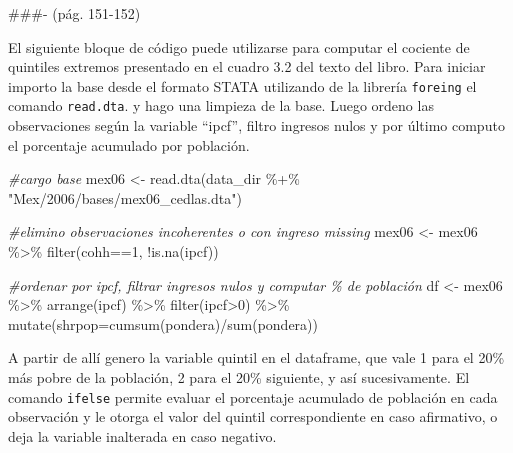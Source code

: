 \documentclass[
]{book}
\newenvironment{Shaded}{\begin{snugshade}}{\end{snugshade}}
\newcommand{\AttributeTok}[1]{\textcolor[rgb]{0.77,0.63,0.00}{#1}}
\newcommand{\CommentTok}[1]{\textcolor[rgb]{0.56,0.35,0.01}{\textit{#1}}}
\newcommand{\DecValTok}[1]{\textcolor[rgb]{0.00,0.00,0.81}{#1}}
\newcommand{\FunctionTok}[1]{\textcolor[rgb]{0.00,0.00,0.00}{#1}}
\newcommand{\NormalTok}[1]{#1}
\newcommand{\OtherTok}[1]{\textcolor[rgb]{0.56,0.35,0.01}{#1}}
\newcommand{\SpecialCharTok}[1]{\textcolor[rgb]{0.00,0.00,0.00}{#1}}
\newcommand{\StringTok}[1]{\textcolor[rgb]{0.31,0.60,0.02}{#1}}
\begin{document}
\#\#\#- (pág. 151-152)

El siguiente bloque de código puede utilizarse para computar el cociente de quintiles extremos presentado en el cuadro 3.2 del texto del libro. Para iniciar importo la base desde el formato STATA utilizando de la librería \texttt{foreing} el comando \texttt{read.dta}. y hago una limpieza de la base. Luego ordeno las observaciones según la variable ``ipcf'', filtro ingresos nulos y por último computo el porcentaje acumulado por población.

\begin{Shaded}
\begin{Highlighting}[]
\CommentTok{\#cargo base}
\NormalTok{mex06 }\OtherTok{\textless{}{-}} \FunctionTok{read.dta}\NormalTok{(data\_dir }\SpecialCharTok{\%+\%} \StringTok{"Mex/2006/bases/mex06\_cedlas.dta"}\NormalTok{)  }

\CommentTok{\#elimino observaciones incoherentes o con ingreso missing}
\NormalTok{mex06 }\OtherTok{\textless{}{-}}\NormalTok{ mex06 }\SpecialCharTok{\%\textgreater{}\%} \FunctionTok{filter}\NormalTok{(cohh}\SpecialCharTok{==}\DecValTok{1}\NormalTok{, }\SpecialCharTok{!}\FunctionTok{is.na}\NormalTok{(ipcf)) }

\CommentTok{\#ordenar por ipcf, filtrar ingresos nulos y computar \% de población}
\NormalTok{df }\OtherTok{\textless{}{-}}\NormalTok{  mex06  }\SpecialCharTok{\%\textgreater{}\%} \FunctionTok{arrange}\NormalTok{(ipcf) }\SpecialCharTok{\%\textgreater{}\%} \FunctionTok{filter}\NormalTok{(ipcf}\SpecialCharTok{\textgreater{}}\DecValTok{0}\NormalTok{) }\SpecialCharTok{\%\textgreater{}\%} 
       \FunctionTok{mutate}\NormalTok{(}\AttributeTok{shrpop=}\FunctionTok{cumsum}\NormalTok{(pondera)}\SpecialCharTok{/}\FunctionTok{sum}\NormalTok{(pondera))}
\end{Highlighting}
\end{Shaded}

A partir de allí genero la variable quintil en el dataframe, que vale 1 para el 20\% más pobre de la población, 2 para el
20\% siguiente, y así sucesivamente. El comando \texttt{ifelse} permite evaluar el porcentaje acumulado de población en cada observación y le otorga el valor del quintil correspondiente en caso afirmativo, o deja la variable inalterada en caso negativo.
\end{document}

